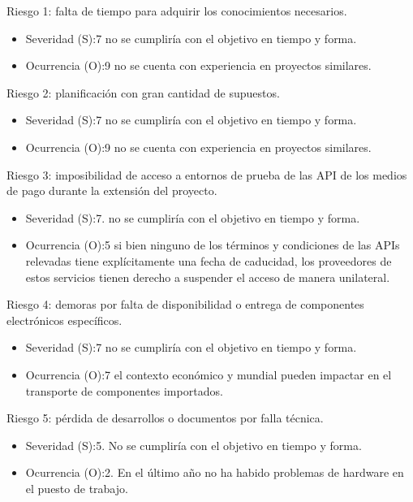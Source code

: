 \documentclass[11pt]{charter}
\begin{document}
Riesgo 1: falta de tiempo para adquirir los conocimientos necesarios. 
\begin{itemize}
\item Severidad (S):7 no se cumpliría con el objetivo en tiempo y forma. 
\item Ocurrencia (O):9 no se cuenta con experiencia en proyectos similares. 
\end{itemize}

Riesgo 2: planificación con gran cantidad de supuestos. 
\begin{itemize}
\item Severidad (S):7 no se cumpliría con el objetivo en tiempo y forma.  
\item Ocurrencia (O):9 no se cuenta con experiencia en proyectos similares. 
\end{itemize}

Riesgo 3: imposibilidad de acceso a entornos de prueba de las API de los medios de pago durante la extensión del proyecto. 
\begin{itemize} 
\item Severidad (S):7. no se cumpliría con el objetivo en tiempo y forma.
\item Ocurrencia (O):5 si bien ninguno de los términos y condiciones de las APIs relevadas tiene explícitamente una fecha de caducidad, los proveedores de estos servicios tienen derecho a suspender el acceso de manera unilateral. 

\end{itemize}


Riesgo 4: demoras por falta de disponibilidad o entrega de componentes electrónicos específicos. 

\begin{itemize}
\item Severidad (S):7 no se cumpliría con el objetivo en tiempo y forma.
\item Ocurrencia (O):7 el contexto económico y mundial pueden impactar en el transporte de componentes importados. 
\end{itemize}


Riesgo 5: pérdida de desarrollos o documentos por falla técnica.  
\begin{itemize}
\item Severidad (S):5. No se cumpliría con el objetivo en tiempo y forma.
\item Ocurrencia (O):2. En el último año no ha habido problemas de hardware en el puesto de trabajo. 
\end{itemize}
\end{document}
